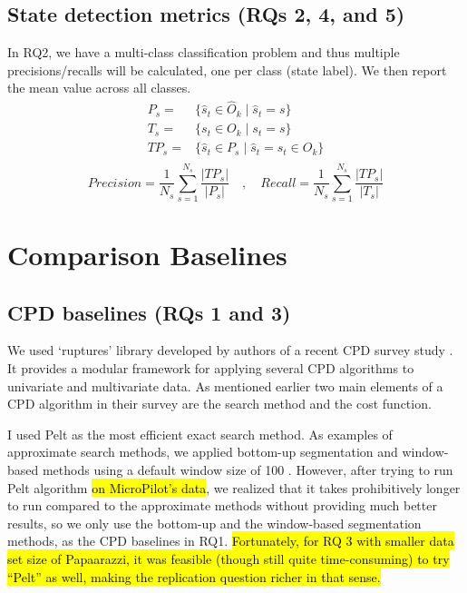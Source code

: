 \subsection{State detection metrics (RQs 2, 4, and 5)}
In RQ2, we have a multi-class classification problem and thus multiple precisions/recalls will be calculated, one per class (state label). We then report the mean value across all classes. 
\begin{equation}
\begin{split}
P_s ={}&{}\big\{\hat{s}_t \in \hat{O}_k \;\big|\; \hat{s}_t = s\big\} \\
T_s ={}&{}\big\{s_t \in O_k \;\big|\; s_t = s\big\} \\
TP_s ={}&{}\big\{\hat{s}_t \in P_s \;\big|\; \hat{s}_t = s_t \in O_k\big\} \\
\end{split}
\end{equation}
$$Precision =\frac{1}{N_s}\sum_{s=1}^{N_s} \frac{|TP_s|}{|P_s|} \quad,\quad Recall = \frac{1}{N_s}\sum_{s=1}^{N_s} \frac{|TP_s|}{|T_s|}$$

\section{Comparison Baselines} 
\subsection{CPD baselines (RQs 1 and 3)} \label{sec:CPD_baseline}
We used `ruptures' library developed by authors of a recent CPD survey study \cite{Truong2018ChangePointSurvey}. It provides a modular framework for applying several CPD algorithms to univariate and multivariate data. %
As mentioned earlier two main elements of a CPD algorithm in their survey are the search method and the cost function.

I used Pelt \cite{killick2012optimal} as the most efficient exact search method. As examples of approximate search methods, we applied bottom-up segmentation and window-based methods using a default window size of 100 \cite{keogh2001online}.
However, after trying to run Pelt algorithm \hl{on MicroPilot's data}, we realized that it takes prohibitively longer to run compared to the approximate methods without providing much better results, so we only use the bottom-up and the window-based segmentation methods, as the CPD baselines in RQ1.
\hl{Fortunately, for RQ 3 with smaller data set size of Papaarazzi, it was feasible (though still quite time-consuming) to try ``Pelt'' as well, making the replication question richer in that sense.}

